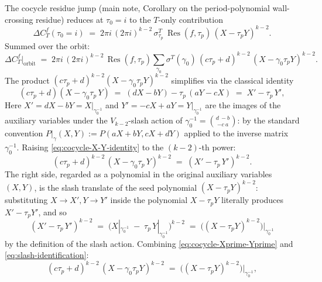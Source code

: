 \documentclass[11pt]{article}
\DeclareMathOperator{\Res}{Res}
\begin{document}
The cocycle residue jump (main note, Corollary on the
period-polynomial wall-crossing residue) reduces at $\tau_0 = i$ to
the $T$-only contribution
\begin{equation}\label{eq:period-single-T}
  \Delta C^f_T(\tau_0 = i)
  \;=\; 2\pi i\,(2\pi i)^{k - 2}\,\sigma^T_{\tau_p}\,
  \Res(f, \tau_p)\,(X - \tau_p Y)^{k - 2}.
\end{equation}
Summed over the orbit:
\begin{equation}\label{eq:period-orbit-sum-raw}
  \Delta C^f_T\bigl|_{\text{orbit}}
  \;=\; 2\pi i\,(2\pi i)^{k - 2}\,\Res(f, \tau_p)\!
  \sum_{\gamma_0}\!\sigma^T(\gamma_0)\,
  (c\tau_p + d)^{k - 2}\,(X - \gamma_0\tau_p Y)^{k - 2}.
\end{equation}
The product $(c\tau_p + d)^{k-2}(X - \gamma_0\tau_p Y)^{k-2}$
simplifies via the classical identity
\begin{equation}\label{eq:cocycle-X-Y-identity}
  (c\tau_p + d)(X - \gamma_0\tau_p\,Y)
  \;=\; (dX - bY) - \tau_p\,(aY - cX)
  \;=\; X' - \tau_p\,Y',
\end{equation}
Here $X' = dX - bY = X|_{\gamma_0^{-1}}$ and $Y' = -cX + aY =
Y|_{\gamma_0^{-1}}$ are the images of the auxiliary variables under
the $V_{k-2}$-slash action of $\gamma_0^{-1} = \binom{d\ -b}{-c\ a}$:
by the standard convention $P|_\gamma(X, Y) := P(aX + bY, cX + dY)$
applied to the inverse matrix $\gamma_0^{-1}$.  Raising \eqref{eq:cocycle-X-Y-identity}
to the $(k-2)$-th power:
\begin{equation}\label{eq:cocycle-Xprime-Yprime}
  (c\tau_p + d)^{k - 2}\,(X - \gamma_0\tau_p\,Y)^{k - 2}
  \;=\; (X' - \tau_p\,Y')^{k - 2}.
\end{equation}
The right side, regarded as a polynomial in the original auxiliary
variables $(X, Y)$, is the slash translate of the seed polynomial
$(X - \tau_p Y)^{k - 2}$: substituting $X \to X', Y \to Y'$ inside
the polynomial $X - \tau_p Y$ literally produces $X' - \tau_p Y'$,
and so
\begin{equation}\label{eq:slash-identification}
  (X' - \tau_p\,Y')^{k - 2}
  \;=\; \bigl(X|_{\gamma_0^{-1}} \;-\; \tau_p\,Y|_{\gamma_0^{-1}}\bigr)^{k - 2}
  \;=\; \bigl((X - \tau_p Y)^{k - 2}\bigr)\big|_{\gamma_0^{-1}}
\end{equation}
by the definition of the slash action.  Combining
\eqref{eq:cocycle-Xprime-Yprime} and \eqref{eq:slash-identification}:
\begin{equation}\label{eq:cocycle-identity}
  (c\tau_p + d)^{k - 2}\,(X - \gamma_0\tau_p Y)^{k - 2}
  \;=\; \bigl((X - \tau_p Y)^{k - 2}\bigr)\big|_{\gamma_0^{-1}},
\end{equation}
\end{document}
